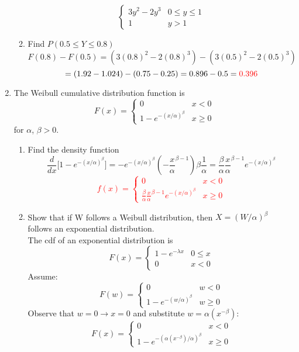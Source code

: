 \documentclass{article}
\begin{document}
\begin{enumerate}
\begin{enumerate}
{\[\begin{cases}
        3y^2-2y^3 & 0 \leq y \leq 1\\
        1 & y > 1
    \end{cases}
        \]}
        \item Find $P(0.5 \leq Y \leq 0.8)$
        \[F(0.8)-F(0.5)=(3(0.8)^2-2(0.8)^3)-(3(0.5)^2-2(0.5)^3)\]
        \[=(1.92-1.024)-(0.75-0.25)=0.896-0.5=\textcolor{red}{0.396}\]
    \end{enumerate}
    \item The Weibull cumulative distribution function is
    \[
    F(x)=
    \begin{cases}
        0 & x < 0\\
        1-e^{-(x/\alpha)^\beta} & x \geq 0
    \end{cases}
    \]
    for $\alpha$, $\beta > 0$.
    \begin{enumerate}
        \item Find the density function
        \[
            \frac{d}{dx} \big[1-e^{-(x/\alpha)^\beta}\big]=-e^{-(x/\alpha)^\beta}(-\frac{x}{\alpha}^{\beta-1})\beta\frac{1}{\alpha}=\frac{\beta}{\alpha}\frac{x}{\alpha}^{\beta-1}e^{-(x/\alpha)^\beta}
        \]
        \textcolor{red}{\[
        f(x)=
        \begin{cases}
            0 & x < 0\\
            \frac{\beta}{\alpha}\frac{x}{\alpha}^{\beta-1}e^{-(x/\alpha)^\beta} & x \geq 0
        \end{cases}
        \]}
        \item Show that if W follows a Weibull distribution, then $X = (W/\alpha)^\beta$ follows an exponential distribution.\\
        The cdf of an exponential distribution is
        \[
        F(x)=
        \begin{cases}
            1 - e^{-\lambda x} & 0 \leq x  \\
            0 & x < 0
        \end{cases}
        \]
        Assume: 
        \[
        F(w)=
        \begin{cases}
            0 & w < 0\\
            1-e^{-(w/\alpha)^\beta} & w \geq 0
        \end{cases}
        \]
        Observe that $w=0 \rightarrow x = 0$ and substitute $w=\alpha (x^{-\beta})$:
        \[ F(x)=
        \begin{cases}
            0 & x < 0\\
            1-e^{-(\alpha (x^{-\beta})/\alpha)^\beta} & x \geq 0

\end{cases}\]
\end{enumerate}
\end{enumerate}
\end{document}
